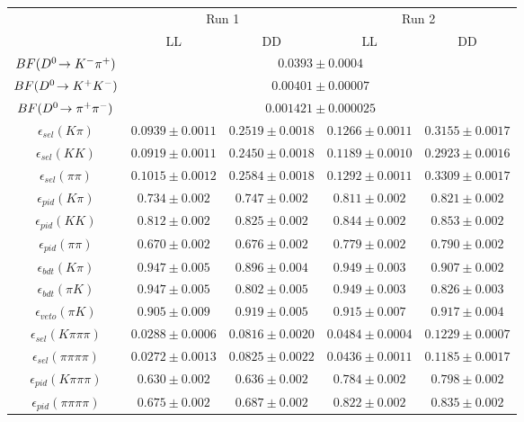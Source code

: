 \begin{table}[h]
\centering
\begin{tabular}{c|cc|cc}
\hline
& \multicolumn{2}{c}{Run 1} & \multicolumn{2}{c}{Run 2} \\
& LL & DD & LL & DD \\
\hline
$BF({{D}^0}\!\rightarrow {\ensuremath{{K}^-}}{\ensuremath{{\pi}^+}})$ & \multicolumn{4}{c}{$0.0393 \pm 0.0004$} \\
$BF({{D}^0}\!\rightarrow {\ensuremath{{K}^+}}{\ensuremath{{K}^-}})$ & \multicolumn{4}{c}{$0.00401 \pm 0.00007$} \\
$BF({{D}^0}\!\rightarrow {\ensuremath{{\pi}^+}}{\ensuremath{{\pi}^-}})$ & \multicolumn{4}{c}{$0.001421 \pm 0.000025$} \\
$\epsilon_{sel}(K\pi)$ & $0.0939 \pm 0.0011$ & $0.2519 \pm 0.0018$ & $0.1266 \pm 0.0011$ & $0.3155 \pm 0.0017$ \\
$\epsilon_{sel}(KK)$ & $0.0919 \pm 0.0011$ & $0.2450 \pm 0.0018$ & $0.1189 \pm 0.0010$ & $0.2923 \pm 0.0016$ \\
$\epsilon_{sel}(\pi\pi)$ & $0.1015 \pm 0.0012$ & $0.2584 \pm 0.0018$ & $0.1292 \pm 0.0011$ & $0.3309 \pm 0.0017$ \\
$\epsilon_{pid}(K\pi)$ & $0.734 \pm 0.002$ & $0.747 \pm 0.002$ & $0.811 \pm 0.002$ & $0.821 \pm 0.002$ \\
$\epsilon_{pid}(KK)$ & $0.812 \pm 0.002$ & $0.825 \pm 0.002$ & $0.844 \pm 0.002$ & $0.853 \pm 0.002$ \\
$\epsilon_{pid}(\pi\pi)$ & $0.670 \pm 0.002$ & $0.676 \pm 0.002$ & $0.779 \pm 0.002$ & $0.790 \pm 0.002$ \\
$\epsilon_{bdt}(K\pi)$ & $0.947 \pm 0.005$ & $0.896 \pm 0.004$ & $0.949 \pm 0.003$ & $0.907 \pm 0.002$ \\
$\epsilon_{bdt}(\pi K)$ & $0.947 \pm 0.005$ & $0.802 \pm 0.005$ & $0.949 \pm 0.003$ & $0.826 \pm 0.003$ \\
$\epsilon_{veto}(\pi K)$ & $0.905 \pm 0.009$ & $0.919 \pm 0.005$ & $0.915 \pm 0.007$ & $0.917 \pm 0.004$ \\
$\epsilon_{sel}(K\pi\pi\pi)$ & $0.0288 \pm 0.0006$ & $0.0816 \pm 0.0020$ & $0.0484 \pm 0.0004$ & $0.1229 \pm 0.0007$ \\
$\epsilon_{sel}(\pi\pi\pi\pi)$ & $0.0272 \pm 0.0013$ & $0.0825 \pm 0.0022$ & $0.0436 \pm 0.0011$ & $0.1185 \pm 0.0017$ \\
$\epsilon_{pid}(K\pi\pi\pi)$ & $0.630 \pm 0.002$ & $0.636 \pm 0.002$ & $0.784 \pm 0.002$ & $0.798 \pm 0.002$ \\
$\epsilon_{pid}(\pi\pi\pi\pi)$ & $0.675 \pm 0.002$ & $0.687 \pm 0.002$ & $0.822 \pm 0.002$ & $0.835 \pm 0.002$ \\

\end{tabular}
\end{table}

